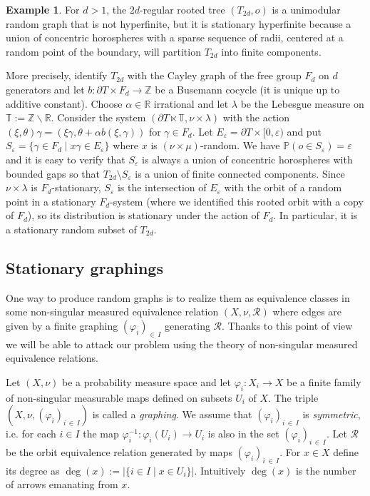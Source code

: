 \documentclass[10pt]{amsart}
\theoremstyle{definition}\newtheorem{defi}[theo]{Definition}\newtheorem{rema}[theo]{Remark}\newtheorem{exam}[theo]{Example}\newtheorem{exem}[theo]{Example}\newtheorem{nota}[theo]{Notation}
\newcommand{\bbR}{\mathbb{R}}
\newcommand{\bbZ}{\mathbb{Z}}
\newcommand{\bbT}{\mathbb{T}}
\newcommand{\bbP}{\mathbb{P}}
\newcommand{\calR}{\mathcal{R}}
\begin{document}
\begin{exam}\label{ex:hyperfinite_tree}
For $d>1$, the $2d$-regular rooted tree $(T_{2d},o)$ is a unimodular random graph that is not hyperfinite, but it is stationary hyperfinite because a union of concentric horospheres with a sparse sequence of radii, centered at a random point of the boundary, will partition $T_{2d}$ into finite components.

More precisely, identify $T_{2d}$ with the Cayley graph of the free group $F_d$ on $d$ generators and let $b\colon\partial T\times F_d\to \bbZ$ be a Busemann cocycle (it is unique up to additive constant). Choose $\alpha\in \bbR$ irrational and let $\lambda$ be the Lebesgue measure on $\bbT:=\bbZ\backslash \bbR$. Consider the system $(\partial T\ltimes \bbT,\nu\times \lambda)$ with the action $(\xi,\theta)\gamma=(\xi\gamma, \theta+\alpha b(\xi,\gamma))$ for $\gamma\in F_d.$ Let $E_\varepsilon=\partial T\times [0,\varepsilon)$ and put $S_\varepsilon=\{\gamma\in F_d \mid x\gamma\in E_\varepsilon\}$ where $x$ is $(\nu\times\mu)$-random. We have $\bbP (o\in S_\varepsilon)=\varepsilon$ and it is easy to verify that $S_\varepsilon$ is always a union of concentric horospheres with bounded gaps so that $T_{2d}\setminus S_{\varepsilon}$ is a union of finite connected components. Since $\nu\times\lambda$ is $F_d$-stationary, $S_\varepsilon$ is the intersection of $E_\varepsilon$ with the orbit of a random point in a stationary $F_d$-system (where we identified this rooted orbit with a copy of $F_d$), so its distribution is stationary under the action of $F_d$. In particular, it is a stationary random subset of $T_{2d}$.
\end{exam}



\subsection{Stationary graphings}\label{sec:stat_graphing}

One way to produce random graphs is to realize them as equivalence classes in some non-singular measured equivalence relation $(X,\nu,\calR)$ where edges are given by a finite graphing $(\varphi_i)_{\in\,I}$ generating $\calR$. Thanks to this point of view we will be able to attack our problem using the theory of non-singular measured equivalence relations.

Let $(X,\nu)$ be a probability measure space and let $\varphi_i:X_i\to X$ be a finite family of non-singular measurable maps defined on subsets $U_i$ of $X$. The triple $(X,\nu,(\varphi_i)_{i\,\in\,I})$ is called a \emph{graphing}. We assume that $(\varphi_i)_{i\,\in\,I}$ is \emph{symmetric}, i.e. for each $i\in I$ the map $\varphi_i^{-1}\colon \varphi_i(U_i)\to U_i$ is also in the set $(\varphi_i)_{i\,\in\,I}$. Let $\calR$ be the orbit equivalence relation generated by maps $(\varphi_i)_{i\,\in\,I}$. For $x\in X$ define its degree as $\deg(x):=|\{i\in I \mid x\in U_i\}|$. Intuitively $\deg(x)$ is the number of arrows emanating from $x$.
\end{document}
